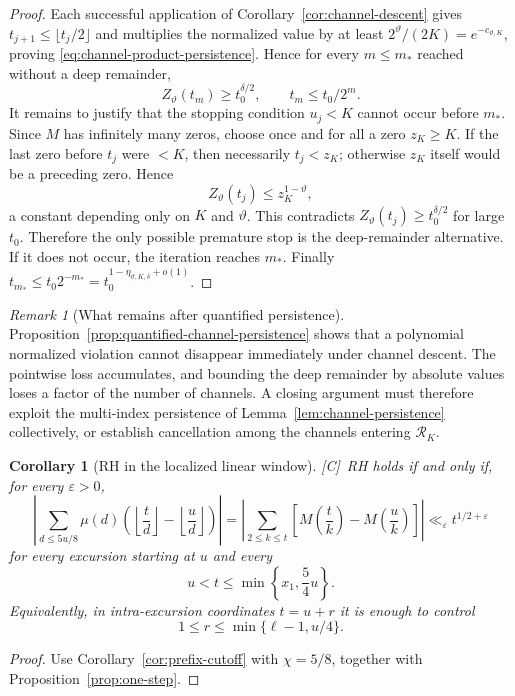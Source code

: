 \documentclass[11pt]{amsart}
\numberwithin{equation}{section}
\theoremstyle{plain}
\newtheorem{corollary}[theorem]{Corollary}
\theoremstyle{definition}
\theoremstyle{remark}
\newtheorem{remark}[theorem]{Remark}
\newcommand{\eps}{\varepsilon}
\newcommand{\tagC}{\textup{[C]}}
\begin{document}
\begin{proof}
Each successful application of Corollary~\ref{cor:channel-descent} gives
$t_{j+1}\le\lfloor t_j/2\rfloor$ and multiplies the normalized value by at
least $2^\vartheta/(2K)=e^{-c_{\vartheta,K}}$, proving
\eqref{eq:channel-product-persistence}. Hence for every $m\le m_*$ reached
without a deep remainder,
\[
 Z_\vartheta(t_m)\ge t_0^{\delta/2},
 \qquad
 t_m\le t_0/2^m.
\]
It remains to justify that the stopping condition $u_j<K$ cannot occur
before $m_*$. Since $M$ has infinitely many zeros, choose once and for all
a zero $z_K\ge K$. If the last zero before $t_j$ were $<K$, then necessarily
$t_j<z_K$; otherwise $z_K$ itself would be a preceding zero. Hence
\[
 Z_\vartheta(t_j)\le z_K^{1-\vartheta},
\]
a constant depending only on $K$ and $\vartheta$. This contradicts
$Z_\vartheta(t_j)\ge t_0^{\delta/2}$ for large $t_0$. Therefore the only
possible premature stop is the deep-remainder alternative. If it does not
occur, the iteration reaches $m_*$. Finally
$t_{m_*}\le t_0 2^{-m_*}=t_0^{1-\eta_{\vartheta,K,\delta}+o(1)}$.
\end{proof}

\begin{remark}[What remains after quantified persistence]
\label{rem:quantified-persistence-gap}
Proposition~\ref{prop:quantified-channel-persistence} shows that a
polynomial normalized violation cannot disappear immediately under channel
descent. The pointwise loss accumulates,
and bounding the deep remainder by absolute values loses a factor of the
number of channels.  A closing argument must therefore exploit the
multi-index persistence of Lemma~\ref{lem:channel-persistence} collectively,
or establish cancellation among the channels entering $\mathcal R_K$.
\end{remark}

\begin{corollary}[RH in the localized linear window]
\label{cor:linear-window-RH}
\tagC\ RH holds if and only if, for every $\eps>0$,
\[
\left|\sum_{d\le5u/8}\mu(d)\left(\left\lfloor\frac td\right\rfloor
-\left\lfloor\frac ud\right\rfloor\right)\right|
=\left|\sum_{2\le k\le t}\left[M\left(\frac tk\right)-M\left(\frac uk\right)\right]\right|
\ll_\eps t^{1/2+\eps}
\]
for every excursion starting at $u$ and every
\[
u<t\le\min\left\{x_1,\frac54u\right\}.
\]
Equivalently, in intra-excursion coordinates $t=u+r$ it is enough to
control
\[
1\le r\le\min\{\ell-1,u/4\}.
\]
\end{corollary}

\begin{proof}
Use Corollary~\ref{cor:prefix-cutoff} with $\chi=5/8$, together with
Proposition~\ref{prop:one-step}.
\end{proof}
\end{document}
